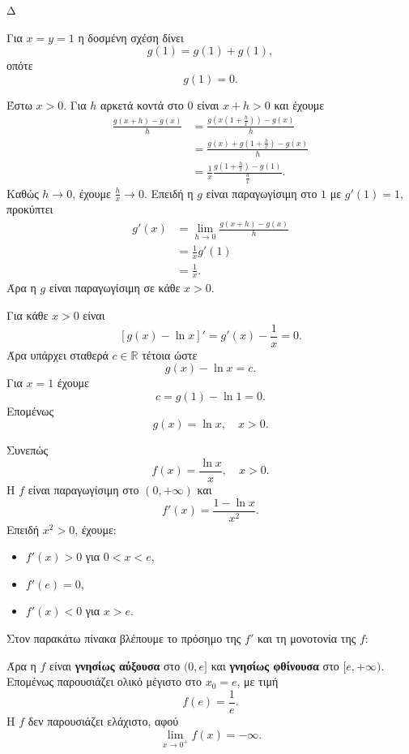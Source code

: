 \begin{thema}{Δ}
\begin{erwthma}
\item Για $x=y=1$ η δοσμένη σχέση δίνει
\[
g(1)=g(1)+g(1),
\]
οπότε
\[
{g(1)=0}.
\]

Έστω $x>0$. Για $h$ αρκετά κοντά στο $0$ είναι $x+h>0$ και έχουμε
\begin{align*}
\frac{g(x+h)-g(x)}{h}
&=\frac{g\left(x\left(1+\frac{h}{x}\right)\right)-g(x)}{h}\\
&=\frac{g(x)+g\left(1+\frac{h}{x}\right)-g(x)}{h}\\
&=\frac{1}{x}
\frac{g\left(1+\frac{h}{x}\right)-g(1)}{\frac{h}{x}}.
\end{align*}
Καθώς $h\to0$, έχουμε $\frac{h}{x}\to0$. Επειδή η $g$ είναι παραγωγίσιμη στο $1$ με $g'(1)=1$, προκύπτει
\begin{align*}
g'(x)
&=\lim_{h\to0}\frac{g(x+h)-g(x)}{h}\\
&=\frac{1}{x}g'(1)\\
&={\frac{1}{x}}.
\end{align*}
Άρα η $g$ είναι παραγωγίσιμη σε κάθε $x>0$.

\item Για κάθε $x>0$ είναι
\[
\left[g(x)-\ln x\right]'
=g'(x)-\frac{1}{x}
=0.
\]
Άρα υπάρχει σταθερά $c\in\mathbb{R}$ τέτοια ώστε
\[
g(x)-\ln x=c.
\]
Για $x=1$ έχουμε
\[
c=g(1)-\ln1=0.
\]
Επομένως
\[
{g(x)=\ln x},\quad x>0.
\]

Συνεπώς
\[
f(x)=\frac{\ln x}{x},\quad x>0.
\]
Η $f$ είναι παραγωγίσιμη στο $(0,+\infty)$ και
\[
f'(x)=\frac{1-\ln x}{x^2}.
\]
Επειδή $x^2>0$, έχουμε:
\begin{itemize}
\item $f'(x)>0$ για $0<x<e$,
\item $f'(e)=0$,
\item $f'(x)<0$ για $x>e$.
\end{itemize}
Στον παρακάτω πίνακα βλέπουμε το πρόσημο της $f'$ και τη μονοτονία της $f$:
\begin{center}
\end{center}

Άρα η $f$ είναι \textbf{γνησίως αύξουσα} στο $(0,e]$ και \textbf{γνησίως φθίνουσα} στο $[e,+\infty)$. Επομένως παρουσιάζει ολικό μέγιστο στο $x_0=e$, με τιμή
\[
{f(e)=\frac{1}{e}}.
\]
Η $f$ δεν παρουσιάζει ελάχιστο, αφού
\[
\lim_{x\to0^+}f(x)=-\infty.
\]


\end{erwthma}
\end{thema}
